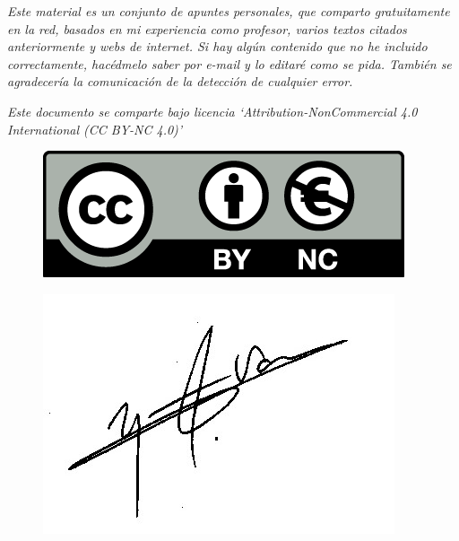 	\textit{Este material es un conjunto de apuntes personales, que comparto gratuitamente en la red, basados en mi experiencia como profesor, varios textos citados anteriormente y webs de internet. Si hay algún contenido que no he incluido correctamente, hacédmelo saber por e-mail y lo editaré como se pida.  También se agradecería la comunicación de la detección de cualquier error.}

\vspace{10mm}
\emph{Este documento se comparte bajo licencia `Attribution-NonCommercial 4.0 International (CC BY-NC 4.0)'}

\vspace{10mm}

\begin{multicols}{2}
\begin{figure}[H]
	\centering
	\includegraphics[width=.4
	\textwidth]{imagenes/imagenes00/licencia.png}
\end{figure}
\begin{figure}[H]
	\centering
	\includegraphics[width=.3
	\textwidth]{imagenes/firma.png}
\end{figure}
\end{multicols}


